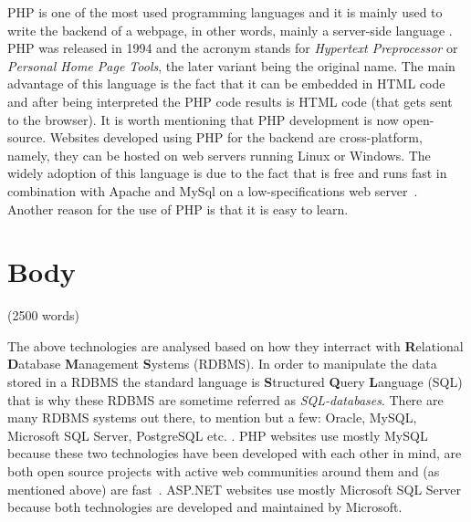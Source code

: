 \documentclass[11]{article}
\begin{document}
	PHP is one of the most used programming languages \citep{cass2014top, cass20152015} and it is mainly used to write the backend of a webpage, in other words, mainly a server-side language . PHP was released in 1994 and the acronym stands for \textit{Hypertext Preprocessor}  or \textit{Personal Home Page Tools}, the later variant being the original name. The main advantage of this language is the fact that it can be embedded in HTML code and after being interpreted the PHP code results is HTML code (that gets sent to the browser). It is worth mentioning that PHP development is now open-source. Websites developed using PHP for the backend are cross-platform, namely, they can be hosted on web servers running Linux or Windows. The widely adoption of this language is due to the fact that is free and runs fast in combination with Apache and MySql on a low-specifications web server~\citep{converse2004php5}. Another reason for the use of PHP is that it is easy to learn.

\pagebreak

\section{Body}(2500 words)

	The above technologies are analysed based on how they interract with \textbf{R}elational \textbf{D}atabase \textbf{M}anagement \textbf{S}ystems (RDBMS). In order to manipulate the data stored in a RDBMS the standard language is \textbf{S}tructured \textbf{Q}uery \textbf{L}anguage (SQL) that is why these RDBMS are sometime referred as \textit{SQL-databases}. There are many RDBMS systems out there, to mention but a few: Oracle, MySQL, Microsoft SQL Server, PostgreSQL etc. . PHP websites use mostly MySQL because these two technologies have been developed with each other in mind, are both open source projects with active web communities around them and (as mentioned above) are fast~\citep{davis2007learning}. ASP.NET websites use mostly Microsoft SQL Server because both technologies are developed and maintained by Microsoft. 

\end{document}
